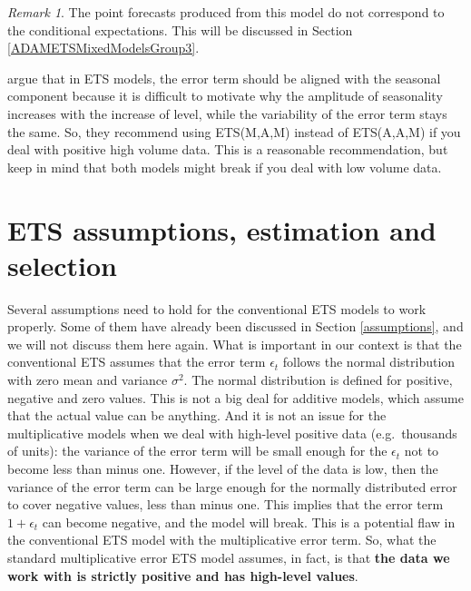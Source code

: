 \documentclass[
]{book}
\theoremstyle{definition}
\theoremstyle{definition}
\theoremstyle{definition}
\theoremstyle{definition}
\theoremstyle{remark}
\newtheorem*{remark}{Remark}
\begin{document}
\begin{remark}
The point forecasts produced from this model do not correspond to the conditional expectations. This will be discussed in Section \ref{ADAMETSMixedModelsGroup3}.
\end{remark}

\citet{Hyndman2008b} argue that in ETS models, the error term should be aligned with the seasonal component because it is difficult to motivate why the amplitude of seasonality increases with the increase of level, while the variability of the error term stays the same. So, they recommend using ETS(M,A,M) instead of ETS(A,A,M) if you deal with positive high volume data. This is a reasonable recommendation, but keep in mind that both models might break if you deal with low volume data.

\hypertarget{ets-assumptions-estimation-and-selection}{%
\section{ETS assumptions, estimation and selection}\label{ets-assumptions-estimation-and-selection}}

Several assumptions need to hold for the conventional ETS models to work properly. Some of them have already been discussed in Section \ref{assumptions}, and we will not discuss them here again. What is important in our context is that the conventional ETS assumes that the error term \(\epsilon_t\) follows the normal distribution with zero mean and variance \(\sigma^2\). The normal distribution is defined for positive, negative and zero values. This is not a big deal for additive models, which assume that the actual value can be anything. And it is not an issue for the multiplicative models when we deal with high-level positive data (e.g.~thousands of units): the variance of the error term will be small enough for the \(\epsilon_t\) not to become less than minus one. However, if the level of the data is low, then the variance of the error term can be large enough for the normally distributed error to cover negative values, less than minus one. This implies that the error term \(1+\epsilon_t\) can become negative, and the model will break. This is a potential flaw in the conventional ETS model with the multiplicative error term. So, what the standard multiplicative error ETS model assumes, in fact, is that \textbf{the data we work with is strictly positive and has high-level values}.
\end{document}
